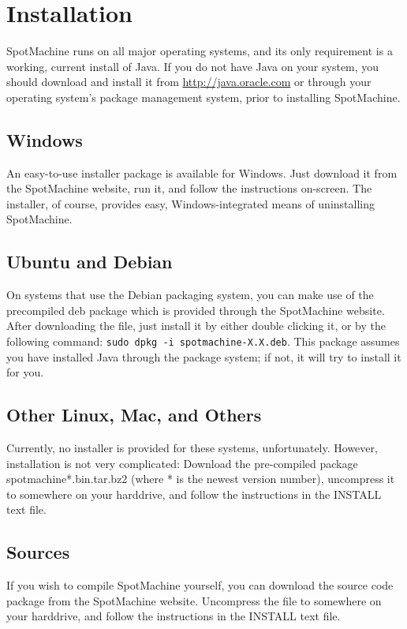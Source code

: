 \documentclass[a4paper,12pt]{article}
\begin{document}
\section{Installation}
SpotMachine runs on all major operating systems, and its only requirement is a working, current install of Java. If you do not have Java on your system, you should download and install it from \url{http://java.oracle.com} or through your operating system's package management system, prior to installing SpotMachine.

\subsection{Windows}
An easy-to-use installer package is available for Windows. Just download it from the SpotMachine website, run it, and follow the instructions on-screen. The installer, of course, provides easy, Windows-integrated means of uninstalling SpotMachine.

\subsection{Ubuntu and Debian}
On systems that use the Debian packaging system, you can make use of the precompiled deb package which is provided through the SpotMachine website. After downloading the file, just install it by either double clicking it, or by the following command: \texttt{sudo dpkg -i spotmachine-X.X.deb}. This package assumes you have installed Java through the package system; if not, it will try to install it for you.

\subsection{Other Linux, Mac, and Others}
Currently, no installer is provided for these systems, unfortunately. However, installation is not very complicated: Download the pre-compiled package spotmachine*.bin.tar.bz2 (where * is the newest version number), uncompress it to somewhere on your harddrive, and follow the instructions in the INSTALL text file.

\subsection{Sources}
If you wish to compile SpotMachine yourself, you can download the source code package from the SpotMachine website. Uncompress the file to somewhere on your harddrive, and follow the instructions in the INSTALL text file.
\end{document}
